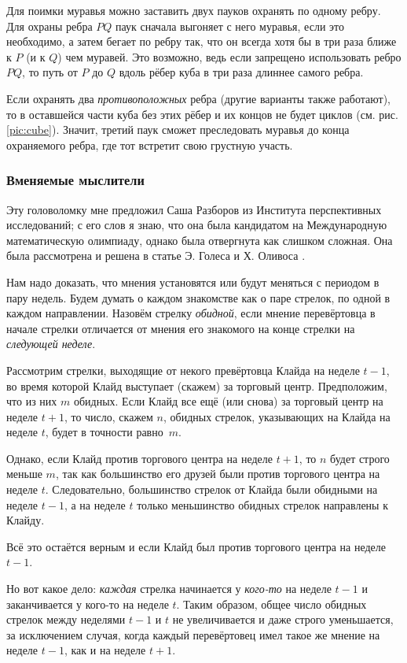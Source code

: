 Для поимки муравья можно заставить двух пауков охранять по одному ребру.
Для охраны ребра $PQ$ паук сначала выгоняет с него муравья, если это необходимо, а затем бегает по ребру так, что он всегда хотя бы в три раза ближе к $P$ (и к $Q$) чем муравей.
Это возможно, ведь если запрещено использовать ребро $PQ$, то путь от $P$ до $Q$ вдоль рёбер куба в три раза длиннее самого ребра.

Если охранять два \emph{противоположных} ребра (другие варианты также работают), то в оставшейся части куба без этих рёбер и их концов не будет циклов (см. рис. \ref{pic:cube}).
Значит, третий паук сможет преследовать муравья до конца охраняемого ребра, где тот встретит свою грустную участь.

\subsubsection*{Вменяемые мыслители}

Эту головоломку мне предложил Саша Разборов из Института перспективных исследований;
с его слов я знаю, что она была кандидатом на Международную математическую олимпиаду, однако была отвергнута как слишком сложная.
Она была рассмотрена и решена в статье Э. Голеса и Х. Оливоса \cite{31}.

Нам надо доказать, что мнения установятся или будут меняться с периодом в пару недель.
Будем думать о каждом знакомстве как о паре стрелок, по одной в каждом направлении.
Назовём стрелку \emph{обидной}, если мнение перевёртовца в начале стрелки отличается от мнения его знакомого на конце стрелки на \emph{следующей неделе}.

Рассмотрим стрелки, выходящие от некого превёртовца Клайда на неделе $t - 1$, во время которой Клайд выступает (скажем) за торговый центр.
Предположим, что из них $m$ обидных.
Если Клайд все ещё (или снова) за торговый центр на неделе $t + 1$, то число, скажем $n$, обидных стрелок, указывающих на Клайда на неделе $t$, будет в точности равно~$m$.

Однако, если Клайд против торгового центра на неделе $t + 1$, то $n$ будет строго меньше $m$, так как большинство его друзей были против торгового центра на неделе $t$.
Следовательно, большинство стрелок от Клайда были обидными на неделе $t - 1$, а на неделе $t$ только меньшинство обидных стрелок направлены к Клайду.

Всё это остаётся верным и если Клайд был против торгового центра на неделе $t - 1$.

Но вот какое дело: \emph{каждая} стрелка начинается у \emph{кого-то} на неделе $t - 1$ и заканчивается у кого-то на неделе $t$.
Таким образом, общее число обидных стрелок между неделями $t - 1$ и $t$ не увеличивается и даже строго уменьшается, за исключением случая, когда каждый перевёртовец имел такое же мнение на неделе $t - 1$, как и на неделе $t + 1$.

